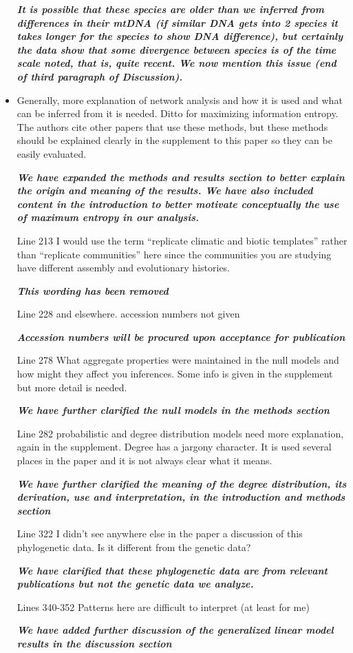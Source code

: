 \documentclass[12pt]{article}
\begin{document}
\begin{itemize}
  \textit{\textbf{It is possible that these species are older than we
      inferred from differences in their mtDNA (if similar DNA gets
      into 2 species it takes longer for the species to show DNA
      difference), but certainly the data show that some divergence
      between species is of the time scale noted, that is, quite
      recent. We now mention this issue (end of third paragraph of
      Discussion).}}
%
\item Generally, more explanation of network analysis and how it is
  used and what can be inferred from it is needed. Ditto for
  maximizing information entropy. The authors cite other papers that
  use these methods, but these methods should be explained clearly in
  the supplement to this paper so they can be easily evaluated.

  \textit{\textbf{We have expanded the methods and results section to
      better explain the origin and meaning of the results. We have
      also included content in the introduction to better motivate
      conceptually the use of maximum entropy in our analysis.}}
%
\item[Line 213] I would use the term ``replicate climatic and biotic
  templates'' rather than ``replicate communities'' here since the
  communities you are studying have different assembly and
  evolutionary histories.

  \textit{\textbf{This wording has been removed}}
%
\item[Line 228] and elsewhere. accession numbers not given

  \textit{\textbf{Accession numbers will be procured upon acceptance
      for publication}}
%
\item[Line 278] What aggregate properties were maintained in the null
  models and how might they affect you inferences. Some info is given
  in the supplement but more detail is needed.

  \textit{\textbf{We have further clarified the null models in the
      methods section}}
%
\item[Line 282] probabilistic and degree distribution models need more
  explanation, again in the supplement. Degree has a jargony
  character. It is used several places in the paper and it is not
  always clear what it means.

  \textit{\textbf{We have further clarified the meaning of the degree
      distribution, its derivation, use and interpretation, in the
      introduction and methods section}}
%
  \item[Line 322] I didn't see anywhere else in the paper a discussion
    of this phylogenetic data. Is it different from the genetic data?

    \textit{\textbf{We have clarified that these phylogenetic data are
        from relevant publications but not the genetic data we
        analyze.}}
%
\item[Lines 340-352] Patterns here are difficult to interpret (at
  least for me)

  \textit{\textbf{We have added further discussion of the generalized
      linear model results in the discussion section}}
\end{itemize}
\end{document}
